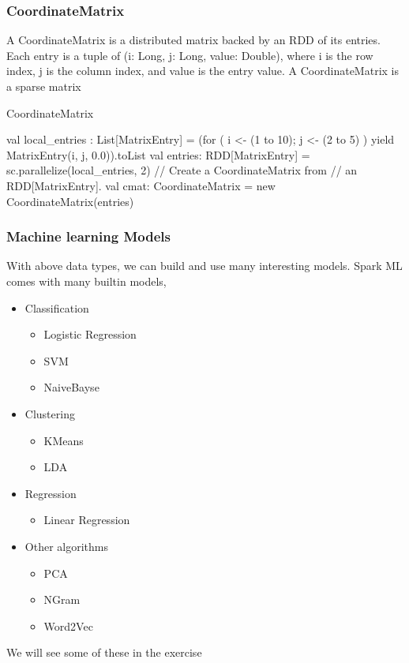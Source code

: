 \documentclass{beamer}
\newcommand{\beb}{\begin{exampleblock}}
\newcommand{\eeb}{\end{exampleblock}}
\begin{document}
\begin{frame}[fragile]
\frametitle{CoordinateMatrix}

A CoordinateMatrix is a distributed matrix backed by an RDD of its entries. 
Each entry is a tuple of (i: Long, j: Long, value: Double), where i is the row index, 
j is the column index, and value is the entry
value. A CoordinateMatrix is a sparse matrix

\beb{CoordinateMatrix}
\begin{code}
val local_entries : List[MatrixEntry] = 
  (for ( i <- (1 to 10); j <- (2 to 5) ) 
  yield MatrixEntry(i, j, 0.0)).toList
val entries: RDD[MatrixEntry] = 
  sc.parallelize(local_entries, 2)
// Create a CoordinateMatrix from 
 // an RDD[MatrixEntry].
val cmat: CoordinateMatrix = new CoordinateMatrix(entries)
\end{code}
\eeb

\end{frame}

\begin{frame}[fragile]
\frametitle{Machine learning Models}
With above data types, we can build and use many interesting models.
Spark ML comes with many builtin models, 
\begin{itemize}
\item Classification
  \begin{itemize}
  \item Logistic Regression
  \item SVM
  \item NaiveBayse
  \end{itemize}
\item Clustering
  \begin{itemize}
     \item KMeans
     \item LDA
  \end{itemize}
\item Regression
   \begin{itemize}
     \item Linear Regression
   \end{itemize}
\item Other algorithms
   \begin{itemize}
     \item PCA
     \item NGram
     \item Word2Vec
   \end{itemize}

\end{itemize}
We will see some of these in the exercise
\end{frame}
\end{document}
